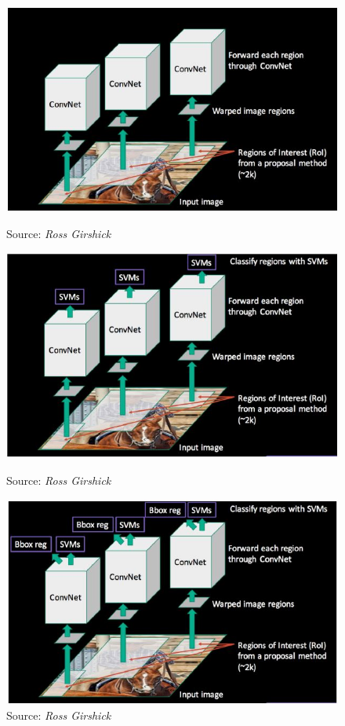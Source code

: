 \begin{frame}
\begin{columns}
\begin{overlayarea}{\textwidth}{\textheight}
\begin{figure}
\begin{overprint}
					\centering\includegraphics[scale= 0.5]{images/36}\caption[Caption]{\hspace{-140pt} Source: \it{Ross Girshick}}
					\centering\includegraphics[scale= 0.5]{images/37}\caption[Caption]{\hspace{-140pt} Source: \it{Ross Girshick}}
					\centering\includegraphics[scale= 0.5]{images/38}\caption[Caption]{\hspace{-140pt} Source: \it{Ross Girshick}}
				\end{overprint}
			\end{figure}
		\end{overlayarea}
		

\end{columns}
\end{frame}
